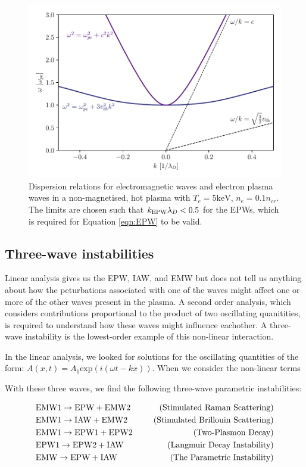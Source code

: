 \begin{figure}[ht]
   \centering
    \includegraphics[width=0.9\columnwidth]{Chapters/C2_Theory/EPW_EMW_dispersion.pdf}
    \caption{Dispersion relations for electromagnetic waves and electron plasma waves in a non-magnetised, hot plasma with $T_e= 5\text{keV}$, $n_e=0.1n_{cr}$. The limits are chosen such that $k_\mathrm{EPW}\lambda_D < 0.5$ for the \acrshort{EPW}s, which is required for Equation \ref{eqn:EPW} to be valid.}
    \label{fig:EMW_EPW_disp}
\end{figure}{}




\subsection{Three-wave instabilities}
Linear analysis gives us the EPW, IAW, and EMW but does not tell us anything about how the peturbations associated with one of the waves might affect one or more of the other waves present in the plasma. A second order analysis, which considers contributions proportional to the product of two oscillating quanitities, is required to understand how these waves might influence eachother. A three-wave instability is the lowest-order example of this non-linear interaction.

 In the linear analysis, we looked for solutions for the oscillating quantities of the form: $A(x,t) = A_1\text{exp}(i(\omega t - kx))$. When we consider the non-linear terms

With these three waves, we find the following three-wave parametric instabilities:

\begin{alignat*}{2}
	 	&\text{EMW1} \rightarrow \text{EPW} + \text{EMW2} &\text{\,\,\,\,\,\,\,\,\,(Stimulated Raman Scattering)}\\
	 	&\text{EMW1} \rightarrow \text{IAW} + \text{EMW2} &\text{\,\,\,\,\,\,\,\,\,(Stimulated Brillouin Scattering)}\\
	 	&\text{EMW1} \rightarrow \text{EPW1} + \text{EPW2} &\text{\,\,\,\,\,\,\,\,\,(Two-Plasmon Decay)}\\
	 	&\text{EPW1} \rightarrow \text{EPW2} + \text{IAW} &\text{\,\,\,\,\,\,\,\,\,(Langmuir Decay Instability)}\\
	 	&\text{EMW} \rightarrow \text{EPW} + \text{IAW} &\text{\,\,\,\,\,\,\,\,\,(The Parametric Instability)}\\
\end{alignat*}



